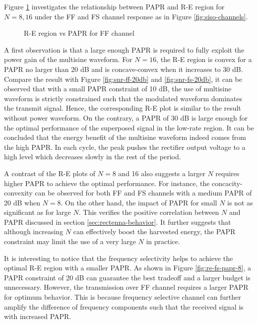 Figure \ref{fig:re-papr} investigates the relationship between PAPR and R-E region for $N = 8, 16$ under the FF and FS channel response as in Figure \ref{fig:siso-channels}.

\begin{figure}[ht]
  \centering
  \quad
  \caption{R-E region vs PAPR for FF channel}
  \label{fig:re-papr}
\end{figure}

A first observation is that a large enough PAPR is required to fully exploit the power gain of the multisine waveform. For $N = 16$, the R-E region is convex for a PAPR no larger than 20 dB and is concave-convex when it increases to 30 dB. Compare the result with Figure \ref{fig:snr-ff-20db} and \ref{fig:snr-fs-20db}, it can be observed that with a small PAPR constraint of 10 dB, the use of multisine waveform is strictly constrained such that the modulated waveform dominates the transmit signal. Hence, the corresponding R-E plot is similar to the result without power waveform. On the contrary, a PAPR of 30 dB is large enough for the optimal performance of the superposed signal in the low-rate region. It can be concluded that the energy benefit of the multisine waveform indeed comes from the high PAPR. In each cycle, the peak pushes the rectifier output voltage to a high level which decreases slowly in the rest of the period.

A contrast of the R-E plots of $N = 8$ and 16 also suggests a larger $N$ requires higher PAPR to achieve the optimal performance. For instance, the concacity-convexity can be observed for both FF and FS channels with a medium PAPR of 20 dB when $N = 8$. On the other hand, the impact of PAPR for small $N$ is not as significant as for large $N$. This verifies the positive correlation between $N$ and PAPR discussed in section \ref{sec:rectenna-behavior}. It further suggests that although increasing $N$ can effectively boost the harvested energy, the PAPR constraint may limit the use of a very large $N$ in practice. 

It is interesting to notice that the frequency selectivity helps to achieve the optimal R-E region with a smaller PAPR. As shown in Figure \ref{fig:re-fs-papr-8}, a PAPR constraint of 20 dB can guarantee the best tradeoff and a larger budget is unnecessary. However, the transmission over FF channel requires a larger PAPR for optimum behavior. This is because frequency selective channel can further amplify the difference of frequency components such that the received signal is with increased PAPR. 